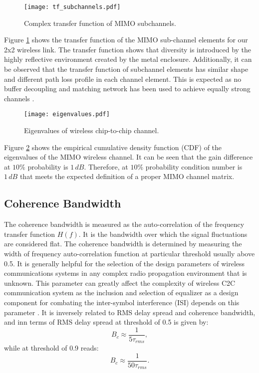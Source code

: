 \documentclass[10pt, final, journal, letterpaper, oneside, twocolumn]{IEEEtran}
\begin{document}
\begin{figure}
    \centering
    \texttt{[image: tf\_subchannels.pdf]}
    \caption{Complex transfer function of MIMO subchannels.}
    \label{fig:tf_subchannels}
\end{figure}

Figure \ref{fig:tf_subchannels} shows the transfer function of the MIMO sub-channel elements for our 2x2 wireless link. The transfer function shows that diversity is introduced by the highly reflective environment created by the metal enclosure. Additionally, it can be observed that the transfer function of subchannel elements has similar shape and different path loss profile in each channel element. 
This is expected as no buffer decoupling and matching network has been used to achieve equally strong channels \cite{Phang2018}. 

\begin{figure}
    \centering
    \texttt{[image: eigenvalues.pdf]}
    \caption{Eigenvalues of wireless chip-to-chip channel.}
    \label{fig:eigenvalues}
\end{figure}

Figure \ref{fig:eigenvalues} shows the empirical cumulative density function (CDF) of the eigenvalues of the MIMO wireless channel. It can be seen that the gain difference at $10\%$ probability is $1\,dB$. Therefore, at $10\%$ probability condition number is $1\,dB$ that meets the expected definition of a proper MIMO channel matrix.

\subsection{Coherence Bandwidth}
The coherence bandwidth is measured as the auto-correlation of the frequency transfer function $H(f)$. It is the bandwidth over which the signal fluctuations are considered flat. The coherence bandwidth is determined by measuring the width of frequency auto-correlation function at particular threshold usually above 0.5. It is generally helpful for the selection of the design parameters of wireless communications systems in any complex radio propagation environment that is unknown. This parameter can greatly affect the complexity of wireless C2C communication system as the inclusion and selection of equalizer as a design component for combating the inter-symbol interference (ISI) depends on this parameter \cite{TannerNEMF}. It is inversely related to RMS delay spread and coherence bandwidth, and inn terms of RMS delay spread at threshold of 0.5 is given by:
\begin{equation}
    B_{c}\approx\frac{1}{5\tau_{rms}},
\end{equation}
while at threshold of 0.9 reads: 
\begin{equation}
    B_{c}\approx\frac{1}{50\tau_{rms}}.
\end{equation}
\end{document}
